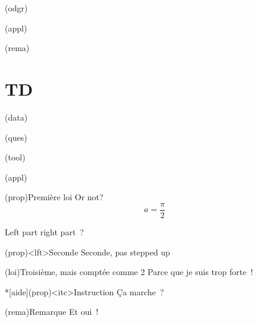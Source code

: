 \documentclass[a4paper, 10pt, garamond]{book}
\begin{document}
\begin{tcb*}(odgr){}

\end{tcb*}

\begin{tcb*}(appl){}

\end{tcb*}

\begin{tcb*}(rema){}

\end{tcb*}

\section{TD}

\begin{tcb*}(data){}

\end{tcb*}

\begin{tcb*}(ques){}

\end{tcb*}

\begin{tcb*}(tool){}

\end{tcb*}

\begin{tcb*}(appl){}

\end{tcb*}

\newpage

\begin{tcb*}(prop){Première loi}
	Or not?
	\[
		a = \frac{\pi}{2}
	\]
	\begin{isd}
		Left part
		\tcblower
		right part~?
	\end{isd}
\end{tcb*}

\begin{tcb}(prop)<lft>{Seconde}
	Seconde, pas stepped up
\end{tcb}

\begin{tcb*}(loi){Troisième, mais comptée comme 2}
	Parce que je suis trop forte~!
\end{tcb*}

\begin{tcb}*[aide](prop)<itc>{Instruction}
	Ça marche~?
\end{tcb}

\begin{tcb}(rema){Remarque}
	Et oui~!
\end{tcb}
\end{document}
